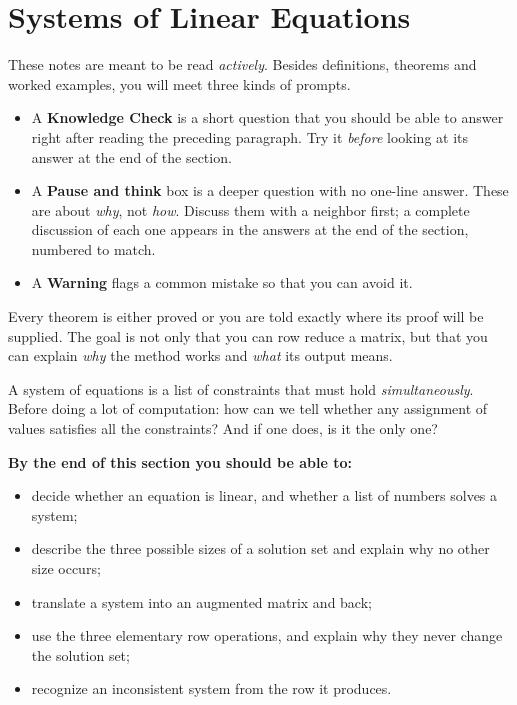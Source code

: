 \documentclass[11pt]{article}
\begin{document}
 
\section{Systems of Linear Equations}
 
\begin{remark}
These notes are meant to be read \emph{actively}. Besides definitions, theorems and worked
examples, you will meet three kinds of prompts.
\begin{itemize}
  \item A \textbf{Knowledge Check} is a short question that you should be able to answer right
        after reading the preceding paragraph. Try it \emph{before} looking at its answer at the
        end of the section.
  \item A \textbf{Pause and think} box is a deeper question with no one-line answer. These are about
        \emph{why}, not \emph{how}. Discuss them with a neighbor first; a complete discussion of each
        one appears in the answers at the end of the section, numbered to match.
  \item A \textbf{Warning} flags a common mistake so that you can avoid it.
\end{itemize}
Every theorem is either proved or you are told exactly where its proof will be supplied.
The goal is not only that you can row reduce a matrix, but that you can explain
\emph{why} the method works and \emph{what} its output means.
\end{remark}
 
\begin{guide}
A system of equations is a list of constraints that must hold \emph{simultaneously}. Before
doing a lot of computation: how can we tell whether any assignment of values satisfies all the
constraints? And if one does, is it the only one?
\end{guide}
 
\textbf{By the end of this section you should be able to:}
\begin{itemize}
  \item decide whether an equation is linear, and whether a list of numbers solves a system;
  \item describe the three possible sizes of a solution set and explain why no other size occurs;
  \item translate a system into an augmented matrix and back;
  \item use the three elementary row operations, and explain why they never change the solution set;
  \item recognize an inconsistent system from the row it produces.
\end{itemize}
 
\end{document}
